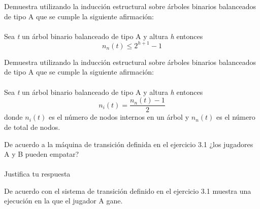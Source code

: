     \begin{exercise}
        Demuestra utilizando la inducción estructural sobre árboles binarios balanceados de tipo A que se cumple la siguiente afirmación:\\\\
        Sea \textit{t} un árbol binario balanceado de tipo A y altura \textit{h} entonces
        \[ n_n(t) \leq 2^{h+1} - 1\]
    \end{exercise}

    \begin{exercise}
Demuestra utilizando la inducción estructural sobre árboles binarios balanceados de tipo A que se cumple la siguiente afirmación:\\\\
        Sea \textit{t} un árbol binario balanceado de tipo A y altura \textit{h} entonces
        \[   n_i(t) = \frac{n_n(t) - 1}{2} \] donde $n_i(t)$ es el número de nodos internos en un árbol y $n_n(t)$ es el número de total de nodos.
    \end{exercise}

    \begin{exercise}
        De acuerdo a la máquina de transición definida en el ejercicio 3.1 ¿los jugadores A y B pueden empatar?\\\\
        Justifica tu respuesta
    \end{exercise}

    \begin{exercise}
        De acuerdo con el sistema de transición definido en el ejercicio 3.1 muestra una ejecución en la que el jugador A gane.
    \end{exercise}


